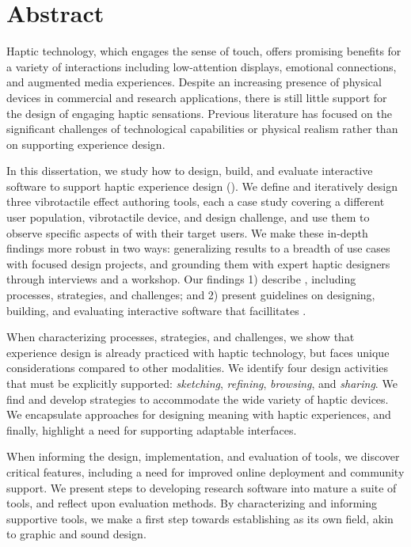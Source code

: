 
\chapter{Abstract}

Haptic technology, which engages the sense of touch, offers promising benefits for a variety of interactions including low-attention displays, emotional connections, and augmented media experiences.
Despite %
an increasing presence of physical devices in commercial and research applications, there is still little support for the design of engaging haptic sensations.
Previous literature has focused on the significant challenges of technological capabilities or physical realism rather than on supporting experience design. %

In this dissertation, we study how to design, build, and evaluate interactive software to support haptic experience design (\haxd).
We define \haxd and iteratively design three vibrotactile effect authoring tools, each a case study covering a different user population, vibrotactile device, and design challenge, and use them to observe specific aspects of \haxd with their target users.
We make these in-depth findings more robust in two ways: generalizing results to a breadth of use cases with focused design projects, and grounding them with expert haptic designers through interviews and a workshop.
Our findings 1) describe \haxd, including processes, strategies, and challenges; and 2) present guidelines on designing, building, and evaluating interactive software that facillitates \haxd.

When characterizing \haxd processes, strategies, and challenges, 
we show that experience design is already practiced with haptic technology, but faces unique considerations compared to other modalities. 
We identify four design activities that must be explicitly supported: \emph{sketching}, \emph{refining}, \emph{browsing}, and \emph{sharing}.
We find and develop strategies to accommodate the wide variety of haptic devices.
We encapsulate approaches for designing meaning with haptic experiences, and finally, highlight a need for supporting adaptable interfaces.

When informing the design, implementation, and evaluation of \haxd tools,
we discover critical features, including a need for improved online deployment and community support.
We present steps to developing research software into mature a \haxd suite of tools, and reflect upon evaluation methods.
%
By characterizing \haxd and informing supportive tools, we make a first step towards establishing \haxd as its own field, akin to graphic and sound design.

